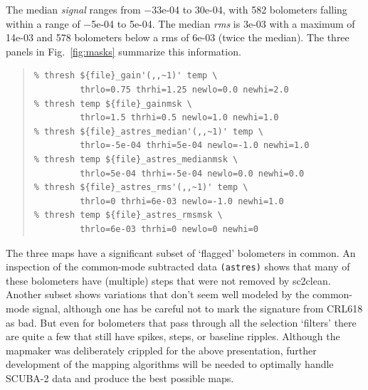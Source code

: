 \documentclass[twoside,11pt]{article}
\newcommand{\xref}[3]{#1}
\renewcommand{\_}{\texttt{\symbol{95}}}
\newenvironment{myquote}{\begin{quote}\begin{small}}{\end{small}\end{quote}}
\newcommand{\task}[1]{\textsf{#1}}
\newcommand{\clean}{\xref{\task{sc2clean}}{sun258}{SC2CLEAN}}
\begin{document}
The median {\sl signal} ranges from $-$33e-04 to 30e-04, with 582
bolometers falling within a range of $-$5e-04 to 5e-04. The median
{\sl rms} is 3e-03 with a maximum of 14e-03 and 578 bolometers
below a rms of 6e-03 (twice the median).  The three panels in
Fig.~\ref{fig:masks} summarize this information.

\begin{myquote}
\begin{verbatim}
% thresh ${file}_gain'(,,~1)' temp \
         thrlo=0.75 thrhi=1.25 newlo=0.0 newhi=2.0
% thresh temp ${file}_gainmsk \
         thrlo=1.5 thrhi=0.5 newlo=1.0 newhi=1.0
% thresh ${file}_astres_median'(,,~1)' temp \
         thrlo=-5e-04 thrhi=5e-04 newlo=-1.0 newhi=1.0
% thresh temp ${file}_astres_medianmsk \
         thrlo=5e-04 thrhi=-5e-04 newlo=0.0 newhi=0.0
% thresh ${file}_astres_rms'(,,~1)' temp \
         thrlo=0 thrhi=6e-03 newlo=-1.0 newhi=1.0
% thresh temp ${file}_astres_rmsmsk \
         thrlo=6e-03 thrhi=0 newlo=0 newhi=0
\end{verbatim}
\end{myquote}

The three maps have a significant subset of `flagged' bolometers in
common.  An inspection of the common-mode subtracted data \texttt{(\_astres)}
shows that many of these bolometers have (multiple) steps that were
not removed by \clean.  Another subset shows variations that don't
seem well modeled by the common-mode signal, although one has be
careful not to mark the signature from CRL618 as bad. But even for
bolometers that pass through all the selection `filters' there are
quite a few that still have spikes, steps, or baseline ripples.
Although the mapmaker was deliberately crippled for the above
presentation, further development of the mapping algorithms will be
needed to optimally handle SCUBA-2 data and produce the best possible
maps.
\end{document}
